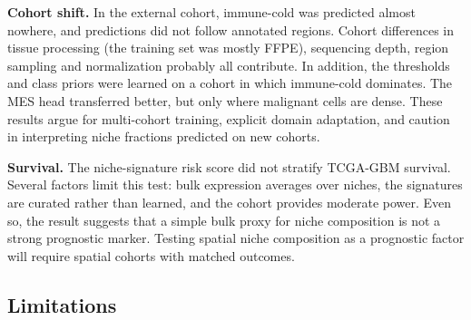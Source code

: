 \documentclass[11pt,letterpaper]{article}
\begin{document}
\textbf{Cohort shift.} In the external cohort, immune-cold was predicted almost nowhere, and predictions did not follow annotated regions. Cohort differences in tissue processing (the training set was mostly FFPE), sequencing depth, region sampling and normalization probably all contribute. In addition, the thresholds and class priors were learned on a cohort in which immune-cold dominates. The MES head transferred better, but only where malignant cells are dense. These results argue for multi-cohort training, explicit domain adaptation, and caution in interpreting niche fractions predicted on new cohorts.

\textbf{Survival.} The niche-signature risk score did not stratify TCGA-GBM survival. Several factors limit this test: bulk expression averages over niches, the signatures are curated rather than learned, and the cohort provides moderate power. Even so, the result suggests that a simple bulk proxy for niche composition is not a strong prognostic marker. Testing spatial niche composition as a prognostic factor will require spatial cohorts with matched outcomes.

\subsection{Limitations}
\end{document}
